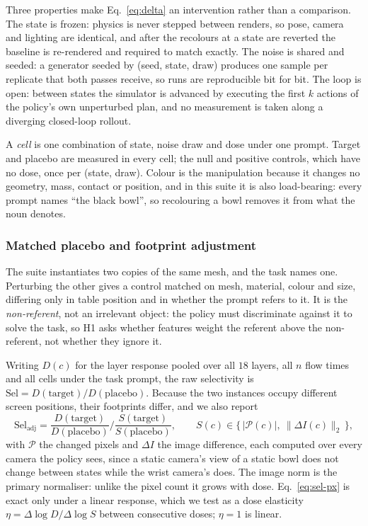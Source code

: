 Three properties make Eq.~\ref{eq:delta} an intervention rather than a
comparison. The state is frozen: physics is never stepped between renders, so
pose, camera and lighting are identical, and after the recolours at a state are
reverted the baseline is re-rendered and required to match exactly. The noise
is shared and seeded: a generator seeded by (seed, state, draw) produces one
sample per replicate that both passes receive, so runs are reproducible bit for
bit. The loop is open: between states the simulator is advanced by executing
the first $k$ actions of the policy's own unperturbed plan, and no measurement
is taken along a diverging closed-loop rollout.

A \emph{cell} is one combination of state, noise draw and dose under one
prompt. Target and placebo are measured in every cell; the null and positive
controls, which have no dose, once per (state, draw). Colour is the
manipulation because it changes no geometry, mass, contact or position, and in
this suite it is also load-bearing: every prompt names ``the black bowl'', so
recolouring a bowl removes it from what the noun denotes.

\subsubsection{Matched placebo and footprint adjustment}
\label{sec:placebo}

The suite instantiates two copies of the same mesh, and the task names one.
Perturbing the other gives a control matched on mesh, material, colour and
size, differing only in table position and in whether the prompt refers to it.
It is the \emph{non-referent}, not an irrelevant object: the policy must
discriminate against it to solve the task, so H1 asks whether features weight
the referent above the non-referent, not whether they ignore it.

Writing $D(c)$ for the layer response pooled over all $18$ layers, all $n$ flow
times and all cells under the task prompt, the raw selectivity is
$\mathrm{Sel}=D(\mathrm{target})/D(\mathrm{placebo})$. Because the two
instances occupy different screen positions, their footprints differ, and we
also report
\begin{equation}
\mathrm{Sel}_{\mathrm{adj}}
=
\frac{D(\mathrm{target})}{D(\mathrm{placebo})}
\bigg/
\frac{S(\mathrm{target})}{S(\mathrm{placebo})},
\qquad
S(c)\in\{\,|\mathcal{P}(c)|,\ \lVert\Delta I(c)\rVert_2\,\},
\label{eq:sel-px}
\end{equation}
with $\mathcal{P}$ the changed pixels and $\Delta I$ the image difference,
each computed over every camera the policy sees, since a static camera's view
of a static bowl does not change between states while the wrist camera's does.
The image norm is the primary normaliser: unlike the pixel count it grows with
dose. Eq.~\ref{eq:sel-px} is exact only under a linear response, which we test
as a dose elasticity $\eta = \Delta\log D/\Delta\log S$ between consecutive
doses; $\eta=1$ is linear.

